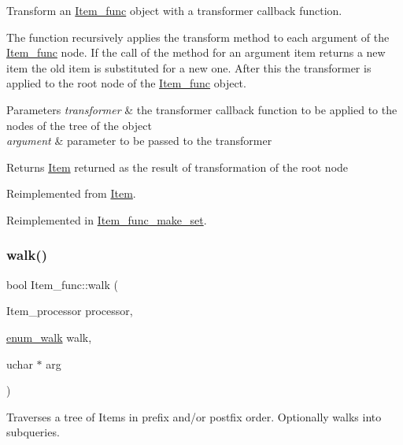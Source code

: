 Transform an \mbox{\hyperlink{classItem__func}{Item\+\_\+func}} object with a transformer callback function.

The function recursively applies the transform method to each argument of the \mbox{\hyperlink{classItem__func}{Item\+\_\+func}} node. If the call of the method for an argument item returns a new item the old item is substituted for a new one. After this the transformer is applied to the root node of the \mbox{\hyperlink{classItem__func}{Item\+\_\+func}} object. 
\begin{DoxyParams}{Parameters}
{\em transformer} & the transformer callback function to be applied to the nodes of the tree of the object \\
\hline
{\em argument} & parameter to be passed to the transformer\\
\hline
\end{DoxyParams}
\begin{DoxyReturn}{Returns}
\mbox{\hyperlink{classItem}{Item}} returned as the result of transformation of the root node 
\end{DoxyReturn}


Reimplemented from \mbox{\hyperlink{classItem_ae4459c9d19c2c656c63da3bbd32760e5}{Item}}.



Reimplemented in \mbox{\hyperlink{classItem__func__make__set_a7f76c6a1bd0ad1f4ecfc30eaa0165d21}{Item\+\_\+func\+\_\+make\+\_\+set}}.

\mbox{\label{classItem__func_af98acc318ebbc106d047a1589884f0ff}} 
\subsubsection{\texorpdfstring{walk()}{walk()}}
{\footnotesize\ttfamily bool Item\+\_\+func\+::walk (\begin{DoxyParamCaption}\item[{Item\+\_\+processor}]{processor,  }\item[{\mbox{\hyperlink{classItem_a4e68f315ba2a26543339e9f0efed3695}{enum\+\_\+walk}}}]{walk,  }\item[{uchar $\ast$}]{arg }\end{DoxyParamCaption})\hspace{0.3cm}{\ttfamily [virtual]}}

Traverses a tree of Items in prefix and/or postfix order. Optionally walks into subqueries.



